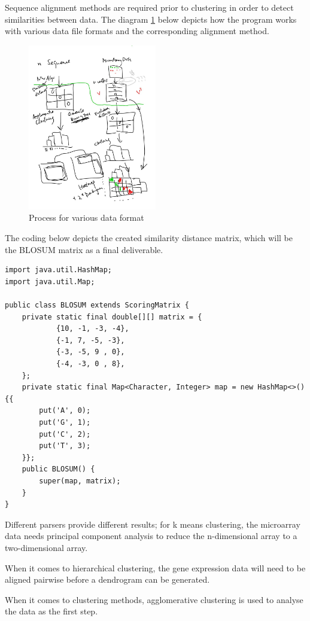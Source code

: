 \documentclass[]{final_report}
\begin{document}
Sequence alignment methods are required prior to clustering in order to detect similarities between data. The diagram \ref{fig:process} below depicts how the program works with various data file formats and the corresponding alignment method.
\begin{figure}[H]
\centering
     \includegraphics[width=0.5\textwidth]{process.JPG}
      \caption{Process for various data format }
       \label{fig:process}
\end{figure}

The coding below depicts the created similarity distance matrix, which will be the BLOSUM matrix as a final deliverable.
\begin{verbatim}
import java.util.HashMap;
import java.util.Map;

public class BLOSUM extends ScoringMatrix {
    private static final double[][] matrix = {
            {10, -1, -3, -4},
            {-1, 7, -5, -3},
            {-3, -5, 9 , 0},
            {-4, -3, 0 , 8},
    };
    private static final Map<Character, Integer> map = new HashMap<>(){{
        put('A', 0);
        put('G', 1);
        put('C', 2);
        put('T', 3);
    }};
    public BLOSUM() {
        super(map, matrix);
    }
}
\end{verbatim}

Different parsers provide different results; for k means clustering, the microarray data needs principal component analysis to reduce the n-dimensional array to a two-dimensional array.

When it comes to hierarchical clustering, the gene expression data will need to be aligned pairwise before a dendrogram can be generated.

When it comes to clustering methods, agglomerative clustering is used to analyse the data as the first step.
\end{document}

